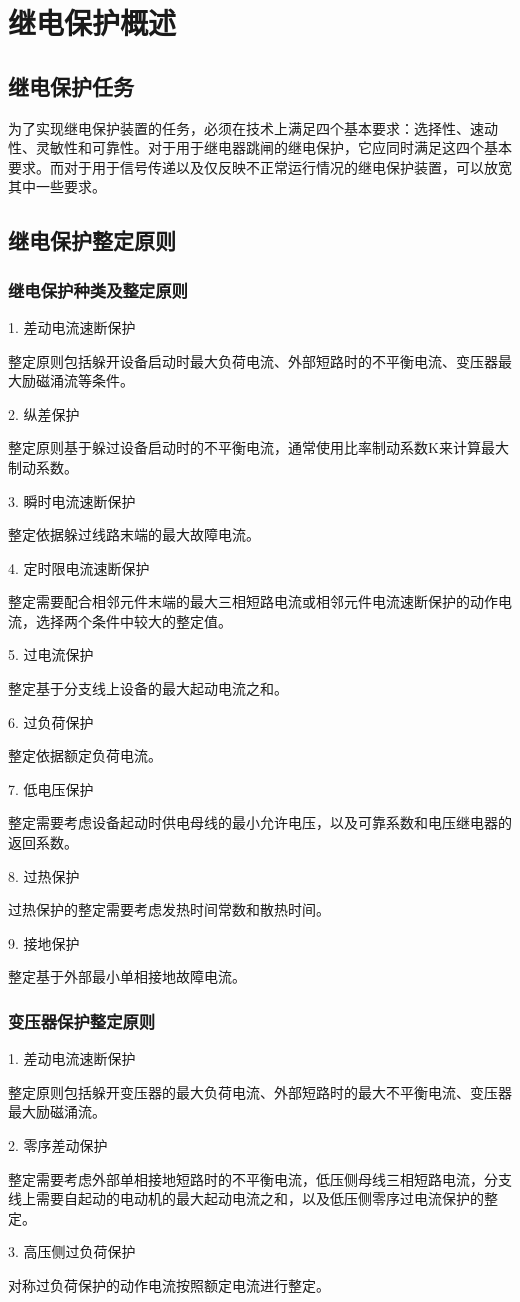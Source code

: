 \chapter{继电保护概述}

\section{继电保护任务}
为了实现继电保护装置的任务，必须在技术上满足四个基本要求：选择性、速动性、灵敏性和可靠性。对于用于继电器跳闸的继电保护，它应同时满足这四个基本要求。而对于用于信号传递以及仅反映不正常运行情况的继电保护装置，可以放宽其中一些要求。
\section{继电保护整定原则}
\subsection{继电保护种类及整定原则}
1. 差动电流速断保护\par
整定原则包括躲开设备启动时最大负荷电流、外部短路时的不平衡电流、变压器最大励磁涌流等条件。\par
2. 纵差保护\par
整定原则基于躲过设备启动时的不平衡电流，通常使用比率制动系数K来计算最大制动系数。\par
3. 瞬时电流速断保护\par
整定依据躲过线路末端的最大故障电流。\par
4. 定时限电流速断保护\par
整定需要配合相邻元件末端的最大三相短路电流或相邻元件电流速断保护的动作电流，选择两个条件中较大的整定值。\par
5. 过电流保护\par
整定基于分支线上设备的最大起动电流之和。\par
6. 过负荷保护\par
整定依据额定负荷电流。\par
7. 低电压保护\par
整定需要考虑设备起动时供电母线的最小允许电压，以及可靠系数和电压继电器的返回系数。\par
8. 过热保护\par
过热保护的整定需要考虑发热时间常数和散热时间。\par
9. 接地保护\par
整定基于外部最小单相接地故障电流。\par
\subsection{变压器保护整定原则}
1. 差动电流速断保护\par
整定原则包括躲开变压器的最大负荷电流、外部短路时的最大不平衡电流、变压器最大励磁涌流。\par
2. 零序差动保护\par
整定需要考虑外部单相接地短路时的不平衡电流，低压侧母线三相短路电流，分支线上需要自起动的电动机的最大起动电流之和，以及低压侧零序过电流保护的整定。\par
3. 高压侧过负荷保护\par
对称过负荷保护的动作电流按照额定电流进行整定。\par
